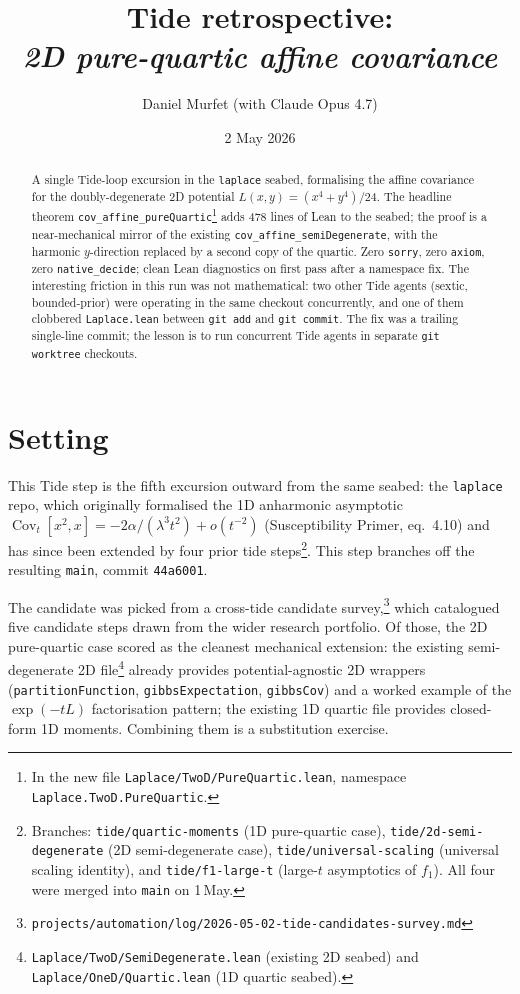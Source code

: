 \documentclass[11pt]{article}
\title{Tide retrospective:\\\emph{2D pure-quartic affine covariance}}
\author{Daniel Murfet (with Claude Opus 4.7)}
\date{2 May 2026}
\begin{document}
\maketitle

\begin{abstract}
A single Tide-loop excursion in the \texttt{laplace} seabed, formalising the
affine covariance for the doubly-degenerate 2D potential
$L(x,y) = (x^4 + y^4)/24$. The headline theorem
\texttt{cov\_affine\_pureQuartic}\footnote{In the new file
\texttt{Laplace/TwoD/PureQuartic.lean}, namespace
\texttt{Laplace.TwoD.PureQuartic}.} adds 478 lines of Lean to the
seabed; the proof is a near-mechanical mirror of the existing
\texttt{cov\_affine\_semiDegenerate}, with the harmonic $y$-direction
replaced by a second copy of the quartic. Zero \texttt{sorry}, zero
\texttt{axiom}, zero \texttt{native\_decide}; clean Lean diagnostics on
first pass after a namespace fix. The interesting friction in this run was
not mathematical: two other Tide agents (sextic, bounded-prior) were
operating in the same checkout concurrently, and one of them clobbered
\texttt{Laplace.lean} between \texttt{git add} and \texttt{git commit}.
The fix was a trailing single-line commit; the lesson is to run
concurrent Tide agents in separate \texttt{git worktree} checkouts.
\end{abstract}

\section{Setting}

This Tide step is the fifth excursion outward from the same seabed: the
\texttt{laplace} repo, which originally formalised the 1D anharmonic
asymptotic
$\operatorname{Cov}_t[x^2,x] = -2\alpha/(\lambda^3 t^2) + o(t^{-2})$
(Susceptibility Primer, eq.~4.10) and has since been extended by four
prior tide steps\footnote{Branches: \texttt{tide/quartic-moments} (1D
pure-quartic case), \texttt{tide/2d-semi-degenerate} (2D semi-degenerate
case), \texttt{tide/universal-scaling} (universal scaling identity), and
\texttt{tide/f1-large-t} (large-$t$ asymptotics of $f_1$). All four were
merged into \texttt{main} on 1\,May.}. This step branches off the
resulting \texttt{main}, commit \texttt{44a6001}.

The candidate was picked from a cross-tide candidate
survey,\footnote{\texttt{projects/automation/log/2026-05-02-tide-candidates-survey.md}}
which catalogued five candidate steps drawn from the wider research
portfolio. Of those, the 2D pure-quartic case scored as the cleanest
mechanical extension: the existing semi-degenerate 2D
file\footnote{\texttt{Laplace/TwoD/SemiDegenerate.lean} (existing 2D
seabed) and \texttt{Laplace/OneD/Quartic.lean} (1D quartic seabed).}
already provides potential-agnostic 2D wrappers
(\texttt{partitionFunction}, \texttt{gibbsExpectation},
\texttt{gibbsCov}) and a worked example of the $\exp(-tL)$
factorisation pattern; the existing 1D quartic file provides closed-form
1D moments. Combining them is a substitution exercise.
\end{document}
